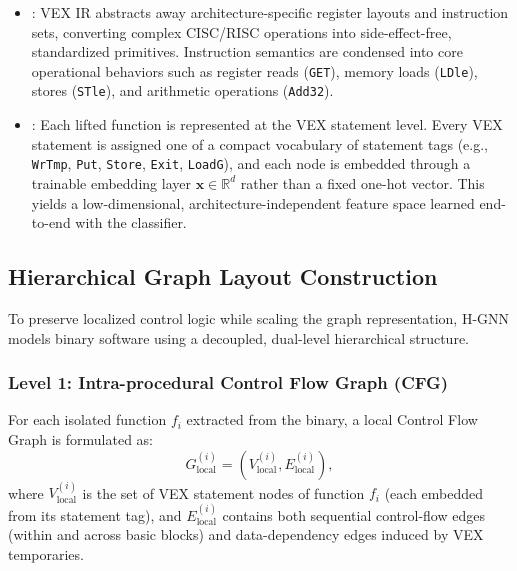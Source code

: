 \documentclass{llncs}
\begin{document}
\begin{itemize}
    \item {}: VEX IR abstracts away architecture-specific register layouts and instruction sets, converting complex CISC/RISC operations into side-effect-free, standardized primitives. Instruction semantics are condensed into core operational behaviors such as register reads (\texttt{GET}), memory loads (\texttt{LDle}), stores (\texttt{STle}), and arithmetic operations (\texttt{Add32}).
    \item {}: Each lifted function is represented at the VEX
statement level. Every VEX statement is assigned one of a compact vocabulary of
statement tags (e.g., \texttt{WrTmp}, \texttt{Put}, \texttt{Store}, \texttt{Exit}, \texttt{LoadG}),
and each node is embedded through a trainable embedding layer $\mathbf{x} \in \mathbb{R}^{d}$
rather than a fixed one-hot vector. This yields a low-dimensional, architecture-independent
feature space learned end-to-end with the classifier.
\end{itemize}

\subsection{Hierarchical Graph Layout Construction}
To preserve localized control logic while scaling the graph representation, H-GNN models binary software using a decoupled, dual-level hierarchical structure.

\subsubsection{Level 1: Intra-procedural Control Flow Graph (CFG)}
For each isolated function $f_i$ extracted from the binary, a local Control Flow Graph is formulated as:
\begin{equation}
G_{\text{local}}^{(i)} = (V_{\text{local}}^{(i)}, E_{\text{local}}^{(i)}),
\end{equation}
where $V_{\text{local}}^{(i)}$ is the set of VEX statement nodes of function $f_i$
(each embedded from its statement tag), and $E_{\text{local}}^{(i)}$ contains both sequential
control-flow edges (within and across basic blocks) and data-dependency edges induced by VEX
temporaries.
\end{document}
